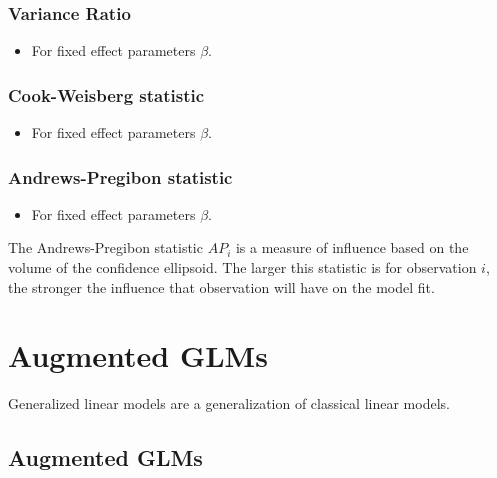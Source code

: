 \documentclass[12pt, a4paper]{report}
\theoremstyle{plain}
\theoremstyle{definition}
\theoremstyle{remark}
\begin{document}
\subsection{Variance Ratio} %
\begin{itemize}
	\item For fixed effect parameters $\beta$.
\end{itemize}

\subsection{Cook-Weisberg statistic} %
\begin{itemize}
	\item For fixed effect parameters $\beta$.
\end{itemize}

\subsection{Andrews-Pregibon statistic} %
\begin{itemize}
	\item For fixed effect parameters $\beta$.
\end{itemize}
The Andrews-Pregibon statistic $AP_{i}$ is a measure of influence based on the volume of the confidence ellipsoid.
The larger this statistic is for observation $i$, the stronger the influence that observation will have on the model fit.



\chapter{Augmented GLMs} 




Generalized linear models are a generalization of classical linear  models.

	\section{Augmented GLMs} %
	
\end{document}
